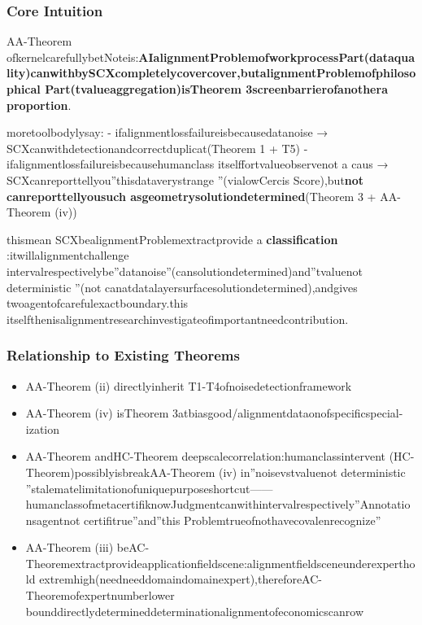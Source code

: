 \documentclass[
  12pt,
]{article}
\providecommand{\tightlist}{%
  \setlength{\itemsep}{0pt}\setlength{\parskip}{0pt}}
\begin{document}
\subsubsection{Core Intuition}\label{ux6838ux5fc3ux76f4ux89c9-4}

AA-Theorem
ofkernelcarefullybetNoteis:\textbf{AIalignmentProblemofworkprocessPart(dataquality)canwithbySCXcompletelycovercover,butalignmentProblemofphilosophical Part(tvalueaggregation)isTheorem
3screenbarrierofanothera   proportion}.

moretoolbodylysay: - ifalignmentlossfailureisbecausedatanoise → SCXcanwithdetectionandcorrectduplicat(Theorem 1
+ T5) - ifalignmentlossfailureisbecausehumanclass itselffortvalueobservenot a caus →
SCXcanreporttellyou''thisdataverystrange ''(vialowCercis
Score),but\textbf{not canreporttellyousuch asgeometrysolutiondetermined}(Theorem 3 + AA-Theorem (iv))

thismean  SCXbealignmentProblemextractprovide a  \textbf{classification }:itwillalignmentchallenge intervalrespectivelybe''datanoise''(cansolutiondetermined)and''tvaluenot deterministic ''(not canatdatalayersurfacesolutiondetermined),andgives twoagentofcarefulexactboundary.this itselfthenisalignmentresearchinvestigateofimportantneedcontribution.

\subsubsection{Relationship to Existing Theorems}\label{ux4e0eux5df2ux6709ux5b9aux7406ux7684ux5173ux7cfb-4}

\begin{itemize}
\tightlist
\item
  AA-Theorem (ii) directlyinherit T1-T4ofnoisedetectionframework
\item
  AA-Theorem (iv) isTheorem 3atbiasgood/alignmentdataonofspecificspecial-ization
\item
  AA-Theorem andHC-Theorem
  deepscalecorrelation:humanclassintervent (HC-Theorem)possiblyisbreakAA-Theorem (iv)
  in''noisevstvaluenot deterministic ''stalematelimitationofuniquepurposeshortcut------humanclassofmetacertifiknowJudgmentcanwithintervalrespectively''Annotationsagentnot certifitrue''and''this Problemtrueofnothavecovalenrecognize''
\item
  AA-Theorem (iii)
  beAC-Theoremextractprovideapplicationfieldscene:alignmentfieldsceneunderexperthold extremhigh(needneeddomaindomainexpert),thereforeAC-Theoremofexpertnumberlower bounddirectlydetermineddeterminationalignmentofeconomicscanrow 
\end{itemize}
\end{document}
